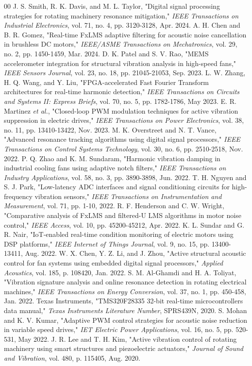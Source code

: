 \documentclass[conference]{IEEEtran}
\begin{document}
\begin{thebibliography}{00}
 J. S. Smith, R. K. Davis, and M. L. Taylor, "Digital signal processing strategies for rotating machinery resonance mitigation," \textit{IEEE Transactions on Industrial Electronics}, vol. 71, no. 4, pp. 3120-3128, Apr. 2024.
 A. H. Chen and B. R. Gomez, "Real-time FxLMS adaptive filtering for acoustic noise cancellation in brushless DC motors," \textit{IEEE/ASME Transactions on Mechatronics}, vol. 29, no. 2, pp. 1450-1459, Mar. 2024.
 D. K. Patel and S. V. Rao, "MEMS accelerometer integration for structural vibration analysis in high-speed fans," \textit{IEEE Sensors Journal}, vol. 23, no. 18, pp. 21045-21053, Sep. 2023.
 L. W. Zhang, H. Q. Wang, and Y. Liu, "FPGA-accelerated Fast Fourier Transform architectures for real-time harmonic detection," \textit{IEEE Transactions on Circuits and Systems II: Express Briefs}, vol. 70, no. 5, pp. 1782-1786, May 2023.
 E. R. Martinez \textit{et al.}, "Closed-loop PWM modulation techniques for active vibration suppression in electric drives," \textit{IEEE Transactions on Power Electronics}, vol. 38, no. 11, pp. 13410-13422, Nov. 2023.
 M. K. Overstreet and N. T. Vance, "Advanced resonance tracking algorithms using digital signal processors," \textit{IEEE Transactions on Control Systems Technology}, vol. 30, no. 6, pp. 2510-2518, Nov. 2022.
 P. Q. Zhao and K. M. Sundaram, "Harmonic vibration damping in industrial cooling fans using adaptive notch filters," \textit{IEEE Transactions on Industry Applications}, vol. 58, no. 3, pp. 3890-3898, Jun. 2022.
 T. H. Nguyen and S. J. Park, "Low-latency ADC interfaces and signal conditioning circuits for high-frequency vibration sensors," \textit{IEEE Transactions on Instrumentation and Measurement}, vol. 71, pp. 1-10, 2022.
 R. F. Henderson and C. W. Wright, "Comparative analysis of FxLMS and filtered-U LMS algorithms in motor noise control," \textit{IEEE Access}, vol. 10, pp. 45200-45212, Apr. 2022.
 K. L. Sundar and G. R. Nair, "IoT-enabled real-time condition monitoring of electric motors using DSP platforms," \textit{IEEE Internet of Things Journal}, vol. 9, no. 15, pp. 13400-13411, Aug. 2022.
 W. X. Chen, Y. Z. Li, and J. Zhou, "Active structural acoustic control for fan systems using embedded digital signal processors," \textit{Applied Acoustics}, vol. 185, p. 108420, Jan. 2022.
 S. M. Al-Ghamdi and H. A. Toliyat, "Vibration signature analysis and online resonance detection in rotating electrical machines," \textit{IEEE Transactions on Energy Conversion}, vol. 37, no. 1, pp. 450-458, Jan. 2022.
 Texas Instruments, "TMS320F28335 32-bit real-time microcontrollers data manual," \textit{Texas Instruments Literature Number}, SPRS439N, 2020.
 S. Mohan and K. V. Kumar, "Adaptive PWM control strategies for acoustic noise reduction in variable speed drives," \textit{IET Electric Power Applications}, vol. 16, no. 5, pp. 520-531, May 2022.
 J. R. Lee and T. H. Kim, "Active vibration control of rotating machinery using smart structures and piezoelectric actuators," \textit{Journal of Sound and Vibration}, vol. 480, p. 115405, Aug. 2020.
\end{thebibliography}
\end{document}
